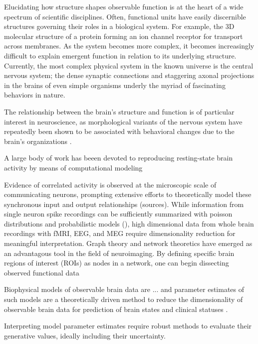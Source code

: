 Elucidating how structure shapes observable function is at the heart of a wide spectrum of scientific disciplines. Often, functional units have easily discernible structures governing their roles in a biological system. For example, the 3D molecular structure of a protein forming an ion channel receptor for transport across membranes. As the system becomes more complex, it becomes increasingly difficult to explain emergent function in relation to its underlying structure. Currently, the most complex physical system in the known universe is the central nervous system; the dense synaptic connections and staggering axonal projections in the brains of even simple organisms underly the myriad of fascinating behaviors in nature.

The relationship between the brain's structure and function is of particular interest in neuroscience, as morphological variants of the nervous system have repeatedly been shown to be associated with behavioral changes due to the brain's organizations \cite{sharp_default_2011, shen_using_2017}. 

A large body of work has beeen devoted to reproducing resting-state brain activity by means of computational modeling

Evidence of correlated activity is observed at the microscopic scale of communicating neurons, prompting extensive efforts to theoretically model these synchronous input  and output relationships (sources). While information from single neuron spike recordings can be sufficiently summarized with poisson distributions and probabilistic models (), high dimensional data from whole brain recordings with fMRI, EEG, and MEG require dimensionality reduction for meaningful interpretation. Graph theory and network theoretics have emerged as an advantagous tool in the field of neuroimaging. By defining specific brain regions of interest (ROIs) as nodes in a network, one can begin dissecting observed functional data 


Biophysical models of observable brain data are ... and parameter estimates of such models are a theoretically driven method to reduce the dimensionality of observable brain data for prediction of brain states and clinical statuses \cite{huys_computational_2016}.

Interpreting model parameter estimates require robust methods to evaluate their generative values, ideally including their uncertainty. 

